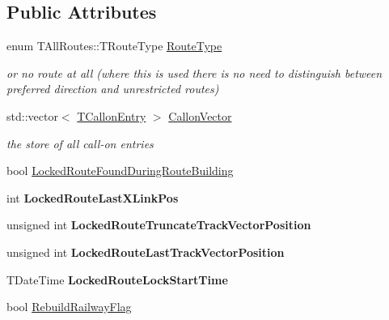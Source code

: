 \subsection*{Public Attributes}
\begin{DoxyCompactItemize}
\item 
enum T\+All\+Routes\+::\+T\+Route\+Type \mbox{\hyperlink{class_t_all_routes_a418f6235db60f6f41c56aede07b5fe24}{Route\+Type}}
\begin{DoxyCompactList}\small\item\em or no route at all (where this is used there is no need to distinguish between preferred direction and unrestricted routes) \end{DoxyCompactList}\item 
\mbox{\label{class_t_all_routes_a3993d52ba2a60f04572838e2cbd78bbf}} 
std\+::vector$<$ \mbox{\hyperlink{class_t_all_routes_1_1_t_callon_entry}{T\+Callon\+Entry}} $>$ \mbox{\hyperlink{class_t_all_routes_a3993d52ba2a60f04572838e2cbd78bbf}{Callon\+Vector}}
\begin{DoxyCompactList}\small\item\em the store of all call-\/on entries \end{DoxyCompactList}\item 
bool \mbox{\hyperlink{class_t_all_routes_a961a443309f2ea74dc4c24b5a94fd8b6}{Locked\+Route\+Found\+During\+Route\+Building}}
\item 
\mbox{\label{class_t_all_routes_a932ef101ca1ede0b8b4c71a697c910fc}} 
int {\bfseries Locked\+Route\+Last\+X\+Link\+Pos}
\item 
\mbox{\label{class_t_all_routes_a81d0fa90e6eccdcf7df2efadb762ae80}} 
unsigned int {\bfseries Locked\+Route\+Truncate\+Track\+Vector\+Position}
\item 
\mbox{\label{class_t_all_routes_ae25faa44924c79b1fa18d974bca16ec8}} 
unsigned int {\bfseries Locked\+Route\+Last\+Track\+Vector\+Position}
\item 
\mbox{\label{class_t_all_routes_a04a50104e401446c3fedfc6901667559}} 
T\+Date\+Time {\bfseries Locked\+Route\+Lock\+Start\+Time}
\item 
bool \mbox{\hyperlink{class_t_all_routes_a140f03788fbf646cb07f3c51f1f19175}{Rebuild\+Railway\+Flag}}

\end{DoxyCompactItemize}
